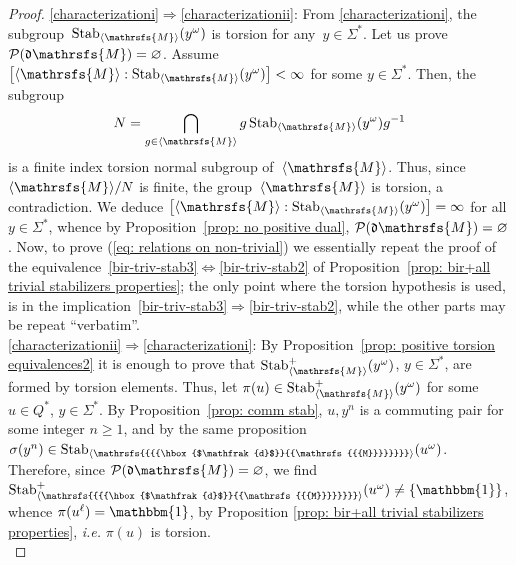\documentclass{amsart}
\begin{document}
\begin{proof}
\ref{characterizationi}$\Rightarrow$\ref{characterizationii}:
From \ref{characterizationi}, the subgroup~$\operatorname{Stab}_{{{\langle}{{\mathrsfs{{{M}}}}}{\rangle}}}(y^{\omega})$ is torsion for any~$y\in {{{\Sigma}}}^{*}$. Let us prove $\mathcal{P}({\hbox{$\mathfrak{d}$}}{{{\mathrsfs{{M}}}}})=\varnothing$. Assume $\left[{{{\langle}{{\mathrsfs{{{M}}}}}{\rangle}}}:\operatorname{Stab}_{{{\langle}{{\mathrsfs{{{M}}}}}{\rangle}}}(y^{\omega})\right]<\infty$ for some $y\in {{{\Sigma}}}^{*}$. Then, the subgroup
$$
N=\bigcap_{g\in {{{\langle}{{\mathrsfs{{{M}}}}}{\rangle}}}}g\operatorname{Stab}_{{{\langle}{{\mathrsfs{{{M}}}}}{\rangle}}}(y^{\omega}) g^{-1}
$$
is a finite index torsion normal subgroup of~${{{\langle}{{\mathrsfs{{{M}}}}}{\rangle}}}$. Thus, since ${{{\langle}{{\mathrsfs{{{M}}}}}{\rangle}}}/N$ is
finite, the group~${{{\langle}{{\mathrsfs{{{M}}}}}{\rangle}}}$ is torsion, a contradiction. We deduce
$\left[{{{\langle}{{\mathrsfs{{{M}}}}}{\rangle}}}:\operatorname{Stab}_{{{\langle}{{\mathrsfs{{{M}}}}}{\rangle}}}(y^{\omega})\right]=\infty$ for all $y\in {{{\Sigma}}}^{*}$,
whence by Proposition~\ref{prop: no positive dual},
$\mathcal{P}({\hbox{$\mathfrak{d}$}}{{{\mathrsfs{{M}}}}})=\varnothing$. Now, to prove (\ref{eq: relations on non-trivial}) we essentially repeat the proof of the equivalence~\ref{bir-triv-stab3}$\Leftrightarrow$\ref{bir-triv-stab2} of Proposition~\ref{prop: bir+all trivial stabilizers properties}; the only point where the torsion hypothesis is used, is in the implication~\ref{bir-triv-stab3}$\Rightarrow$\ref{bir-triv-stab2}, while the other parts may be repeat ``verbatim''. \\
\ref{characterizationii}$\Rightarrow$\ref{characterizationi}: By Proposition~\ref{prop: positive torsion equivalences2} it is enough to prove that $\operatorname{Stab}^{+}_{{{\langle}{{\mathrsfs{{{M}}}}}{\rangle}}}(y^{\omega})$, $y\in {{{\Sigma}}}^{*}$, are formed by torsion elements. Thus, let $\pi(u)\in \operatorname{Stab}^{+}_{{{\langle}{{\mathrsfs{{{M}}}}}{\rangle}}}(y^{\omega})$ for some~$u\in {{{Q}}}^{*}$, $y\in {{{\Sigma}}}^{*}$. By Proposition~\ref{prop: comm stab}, $u, y^{n}$ is a commuting pair for some integer $n\ge 1$, and by the same proposition $\sigma(y^{n})\in \operatorname{Stab}_{{{{\langle}{{\mathrsfs{{{{\hbox{$\mathfrak{d}$}}{{\mathrsfs{{{M}}}}}}}}}}{\rangle}}}}(u^{\omega})$. Therefore, since $\mathcal{P}({\hbox{$\mathfrak{d}$}}{{{\mathrsfs{{M}}}}})=\varnothing$, we find $\operatorname{Stab}^{+}_{{{{\langle}{{\mathrsfs{{{{\hbox{$\mathfrak{d}$}}{{\mathrsfs{{{M}}}}}}}}}}{\rangle}}}}(u^{\omega})\neq \{\operatorname{\mathbbm{1}}\}$, whence $\pi(u^{\ell})=\operatorname{\mathbbm{1}}$, by Proposition \ref{prop: bir+all trivial stabilizers properties}, \emph{i.e.} $\pi(u)$ is torsion.\\

\end{proof}
\end{document}
